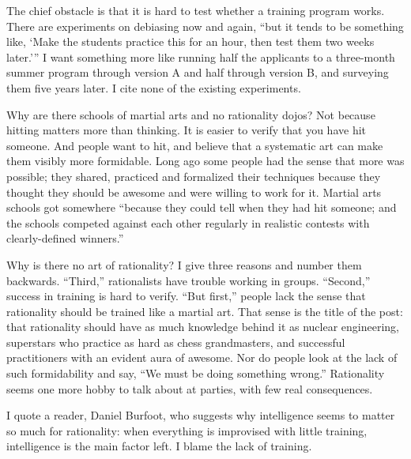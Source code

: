 The chief obstacle is that it is hard to test whether a training program works. There are experiments on debiasing now and again, ``but it tends to be something like, `Make the students practice this for an hour, then test them two weeks later.''' I want something more like running half the applicants to a three-month summer program through version A and half through version B, and surveying them five years later. I cite none of the existing experiments. 

Why are there schools of martial arts and no rationality dojos? Not because hitting matters more than thinking. It is easier to verify that you have hit someone. And people want to hit, and believe that a systematic art can make them visibly more formidable. Long ago some people had the sense that more was possible; they shared, practiced and formalized their techniques because they thought they should be awesome and were willing to work for it. Martial arts schools got somewhere ``because they could tell when they had hit someone; and the schools competed against each other regularly in realistic contests with clearly-defined winners.''

Why is there no art of rationality? I give three reasons and number them backwards. ``Third,'' rationalists have trouble working in groups. ``Second,'' success in training is hard to verify. ``But first,'' people lack the sense that rationality should be trained like a martial art. That sense is the title of the post: that rationality should have as much knowledge behind it as nuclear engineering, superstars who practice as hard as chess grandmasters, and successful practitioners with an evident aura of awesome. Nor do people look at the lack of such formidability and say, ``We must be doing something wrong.'' Rationality seems one more hobby to talk about at parties, with few real consequences.

I quote a reader, Daniel Burfoot, who suggests why intelligence seems to matter so much for rationality: when everything is improvised with little training, intelligence is the main factor left. I blame the lack of training. 
